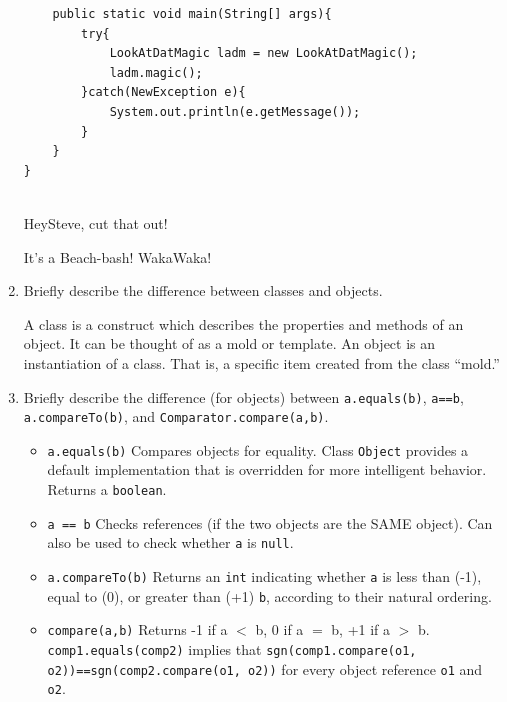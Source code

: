 \documentclass[11pt]{article}
\newenvironment{answer}{\large\lstset{basicstyle=\tiny\ttfamily}\color{white}}{}
\newenvironment{answer}{\large\lstset{basicstyle=\large\ttfamily}\color{red}}{}
\begin{document}
\begin{enumerate}
\begin{lstlisting}
    public static void main(String[] args){
        try{
            LookAtDatMagic ladm = new LookAtDatMagic();
            ladm.magic();
        }catch(NewException e){
            System.out.println(e.getMessage());
        }
    }
}


\end{lstlisting}
\begin{answer}
HeySteve, cut that out!


It's a Beach-bash! WakaWaka!
\end{answer}
\pagebreak
\item Briefly describe the difference between classes and objects.

    \begin{answer}
    A class is a construct which describes the properties and methods of an
    object. It can be thought of as a mold or template. An object is an 
    instantiation of a class. That is, a specific item created from the class
    ``mold.''
    \end{answer}

\item Briefly describe the difference (for objects) between \texttt{a.equals(b)}, \texttt{a==b},
      \texttt{a.compareTo(b)}, and \texttt{Comparator.compare(a,b)}.

    \begin{answer}
    \begin{itemize}

    \item \texttt{a.equals(b)} Compares objects for equality. Class \texttt{Object} provides a default implementation
	that is overridden for more intelligent behavior.
    Returns a \texttt{boolean}.

    \item \texttt{a == b}  Checks references (if the two objects are the SAME object).
    Can also be used to check whether \texttt{a} is \texttt{null}.

    \item \texttt{a.compareTo(b)} Returns an \texttt{int} indicating whether \texttt{a} is less than (-1),
    equal to (0), or greater than (+1) \texttt{b}, according to their natural ordering.

    \item \texttt{compare(a,b)} Returns -1 if a $<$ b, 0 if a $=$ b, +1 if a $>$ b.
    \texttt{comp1.equals(comp2)} implies that \texttt{sgn(comp1.compare(o1,
    o2))==sgn(comp2.compare(o1, o2))} for every object reference \texttt{o1} and \texttt{o2}.


\end{itemize}
\end{answer}
\end{enumerate}
\end{document}
